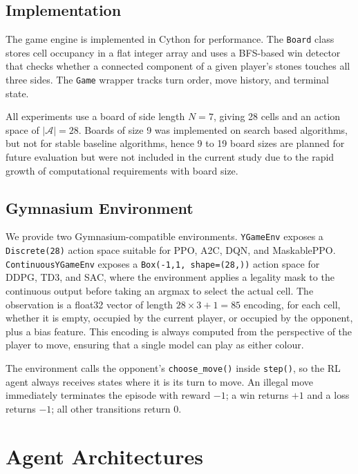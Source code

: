 \documentclass[conference]{IEEEtran}
\begin{document}
\subsection{Implementation}

The game engine is implemented in Cython for performance. The \texttt{Board}
class stores cell occupancy in a flat integer array and uses a BFS-based win
detector that checks whether a connected component of a given player's stones
touches all three sides. The \texttt{Game} wrapper tracks turn order, move
history, and terminal state.

All experiments use a board of side length $N = 7$, giving 28 cells and an
action space of $|\mathcal{A}| = 28$. Boards of size 9 was implemented on search based algorithms, but not for stable baseline algorithms, hence 9 to 19 board sizes are planned for
future evaluation but were not included in the current study due to
the rapid growth of computational requirements with board size.

\subsection{Gymnasium Environment}

We provide two Gymnasium-compatible environments. \texttt{YGameEnv} exposes a
\texttt{Discrete(28)} action space suitable for PPO, A2C, DQN, and MaskablePPO.
\texttt{ContinuousYGameEnv} exposes a \texttt{Box(-1,1, shape=(28,))} action
space for DDPG, TD3, and SAC, where the environment applies a legality mask to
the continuous output before taking an argmax to select the actual cell. The
observation is a float32 vector of length $28 \times 3 + 1 = 85$ encoding, for
each cell, whether it is empty, occupied by the current player, or occupied by the
opponent, plus a bias feature. This encoding is always computed from the
perspective of the player to move, ensuring that a single model can play as
either colour.

The environment calls the opponent's \texttt{choose\_move()} inside
\texttt{step()}, so the RL agent always receives states where it is its turn to
move. An illegal move immediately terminates the episode with reward $-1$; a win
returns $+1$ and a loss returns $-1$; all other transitions return $0$.

\section{Agent Architectures}
\end{document}
